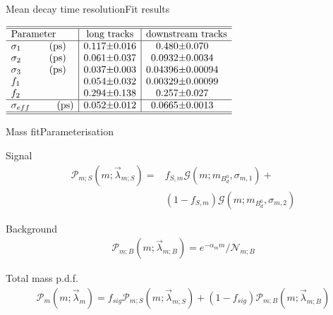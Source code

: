 \documentclass{beamer}
\newcommand{\Bd}{$B_d^0$}
\begin{document}
    \begin{frame}{Mean decay time resolution}{Fit results}
    \begin{center}
    $\begin{array}{l | r@{\pm}l | r@{\pm}l}
\hline 
\hline
\text{Parameter} & \multicolumn{2}{c|}{\text{long tracks}} & \multicolumn{2}{c}{\text{downstream tracks}}\\
\hline
\sigma_{1}\hspace{1cm}(\text{ps}) &	0.117 & 0.016 & 0.480 & 0.070\\
\sigma_{2}\hspace{1cm}(\text{ps}) &	0.061 & 0.037 & 0.0932 & 0.0034\\
\sigma_{3}\hspace{1cm}(\text{ps}) &0.037 &	0.003 & 0.04396 & 0.00094  \\
f_{1} & 0.054 & 0.032 & 0.00329 & 0.00099\\
f_{2} & 0.294 & 0.138 & 0.257 & 0.027\\ \hline 
\sigma_{eff}\hspace{0.95cm}(\text{ps}) & 0.052 & 0.012 & 0.0665 & 0.0013 \\ \hline \hline
\end{array}$   
    \end{center}
    \end{frame}        	
	
	\begin{frame}{Mass fit}{Parameterisation}
	\begin{block}{Signal}
	\begin{align}
\nonumber \mathcal{P}_{m;S}(m;\vec{\lambda}_{m;S}) = &f_{S,m}\mathcal{G}(m;m_{\text{\Bd}},\sigma_{m,1}) + \\
&(1-f_{S,m})\mathcal{G}(m;m_{\text{\Bd}},\sigma_{m,2})
\end{align}
\end{block}
\begin{block}{Background}
\begin{align}
\mathcal{P}_{m;B}(m;\vec{\lambda}_{m;B}) = e^{-\alpha_m m}/\mathcal{N}_{m;B}
\end{align}
\end{block}
\begin{block}{Total mass p.d.f.}
\begin{align}
\mathcal{P}_{m}(m;\vec{\lambda}_{m}) = f_{sig}\mathcal{P}_{m;S}(m;\vec{\lambda}_{m;S}) + (1-f_{sig})\mathcal{P}_{m;B}(m;\vec{\lambda}_{m;B})
\end{align}
\end{block}
	\end{frame}
	
\end{document}
